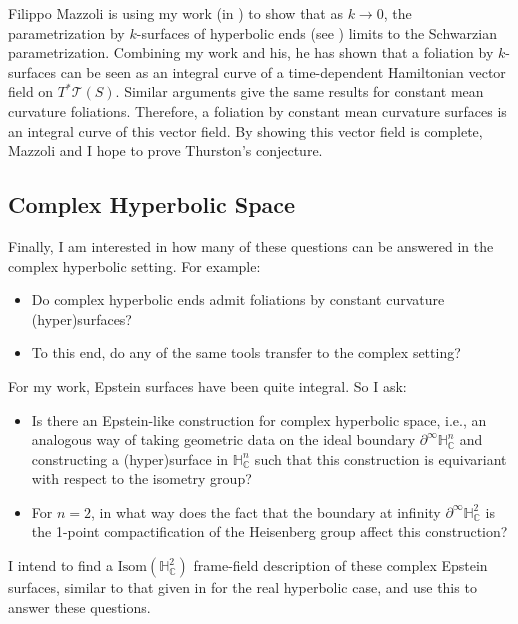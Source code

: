 \documentclass[11pt]{amsart}
\newcommand{\C}{\mathbb{C}}
\renewcommand{\H}{\mathbb{H}}
\begin{document}
Filippo Mazzoli is using my work (in \cite{mazzoli2019}) to show that as $k \to 0$, the parametrization by $k$-surfaces of hyperbolic ends (see \cite{labourie1992}) limits to the Schwarzian parametrization. 
Combining my work and his, he has shown that a foliation by $k$-surfaces can be seen as an integral curve of a time-dependent Hamiltonian vector field on $T^*\mathcal{T}(S)$. 
Similar arguments give the same results for constant mean curvature foliations. 
Therefore, a foliation by constant mean curvature surfaces is an integral curve of this vector field. 
By showing this vector field is complete, Mazzoli and I hope to prove Thurston's conjecture.  

\subsection{Complex Hyperbolic Space}
Finally, I am interested in how many of these questions can be answered in the complex hyperbolic setting. 
For example:
\begin{itemize}
\item Do complex hyperbolic ends admit foliations by constant curvature (hyper)surfaces?
\item To this end, do any of the same tools transfer to the complex setting? 
\end{itemize}
For my work, Epstein surfaces have been quite integral. 
So I ask:
\begin{itemize}
\item Is there an Epstein-like construction for complex hyperbolic space, i.e., an analogous way of taking geometric data on the ideal boundary $\partial^\infty \H_{\C}^n$ and constructing a (hyper)surface in $\H_{\C}^n$ such that this construction is equivariant with respect to the isometry group? 
\item For $n=2$, in what way does the fact that the boundary at infinity $\partial^\infty \H_{\C}^2$ is the 1-point compactification of the Heisenberg group affect this construction?
\end{itemize}
I intend to find a $\mathrm{Isom}(\H_{\C}^2)$ frame-field description of these complex Epstein surfaces, similar to that given in \cite{dumas2017} for the real hyperbolic case, and use this to answer these questions.






\end{document}
